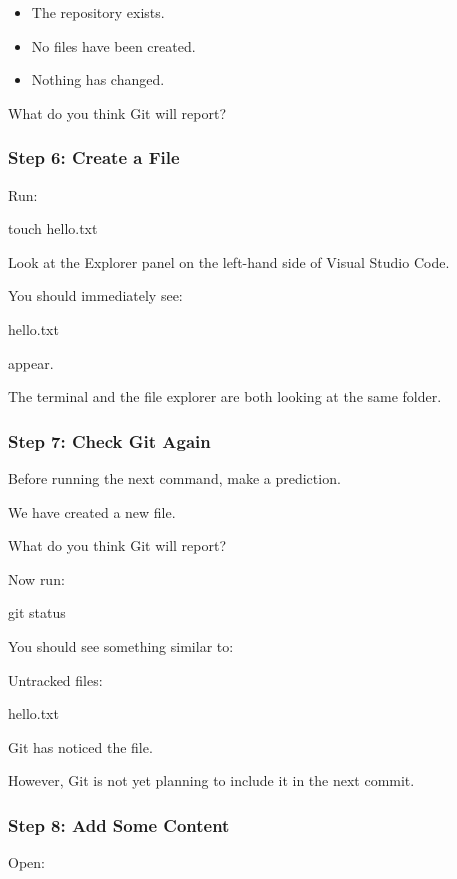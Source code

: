 \documentclass{csc2059practical}
\begin{document}
\begin{itemize}
  \item The repository exists.
  \item No files have been created.
  \item Nothing has changed.
\end{itemize}
What do you think Git will report?

\subsubsection{Step 6: Create a File}
Run:

\begin{terminalplain}
touch hello.txt
\end{terminalplain}
Look at the Explorer panel on the left-hand side of Visual Studio Code.

You should immediately see:

\begin{terminalplain}
hello.txt
\end{terminalplain}
appear.

The terminal and the file explorer are both looking at the same folder.

\subsubsection{Step 7: Check Git Again}
Before running the next command, make a prediction.

We have created a new file.

What do you think Git will report?

Now run:

\begin{terminalplain}
git status
\end{terminalplain}
You should see something similar to:

\begin{terminalplain}
Untracked files:
\end{terminalplain}
\begin{terminalplain}
hello.txt
\end{terminalplain}
Git has noticed the file.

However, Git is not yet planning to include it in the next commit.

\subsubsection{Step 8: Add Some Content}
Open:
\end{document}
